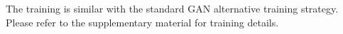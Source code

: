 \documentclass[10pt,twocolumn,letterpaper]{article}
\begin{document}
The training is similar with the standard GAN alternative training strategy. Please refer to the supplementary material for training details.









%			
\end{document}
